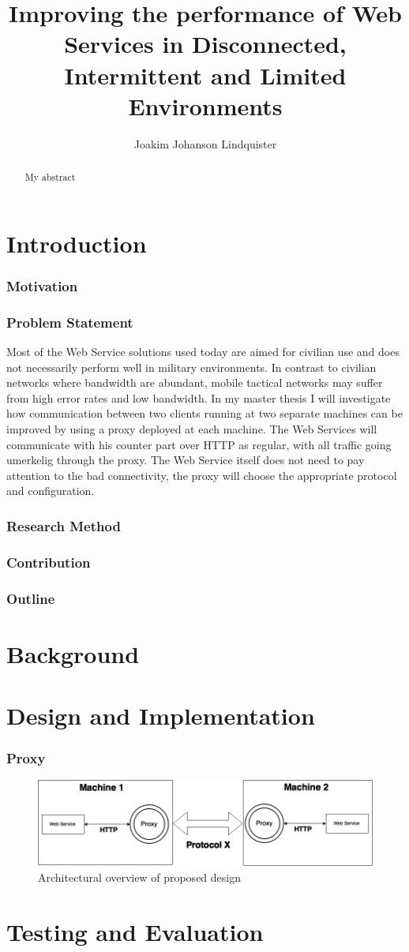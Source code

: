 \documentclass[USenglish]{article}
\title{Improving the performance of Web Services in Disconnected, Intermittent and Limited Environments}
\author{Joakim Johanson Lindquister}
\begin{document}
\ififorside{}

\begin{abstract}
    My abstract
\end{abstract}

\part{Introduction}
\section{Motivation}
\section{Problem Statement}
Most of the Web Service solutions used today are aimed for civilian use and does not necessarily perform well in military environments. In contrast to civilian networks where bandwidth are abundant, mobile tactical networks may suffer from high error rates and low bandwidth. In my master thesis I will investigate how communication between two clients running at two separate machines can be improved by using a proxy deployed at each machine. The Web Services will communicate with his counter part over HTTP as regular, with all traffic going umerkelig through the proxy. The Web Service itself does not need to pay attention to the bad connectivity, the proxy will choose the appropriate protocol and configuration.
\section{Research Method}
\section{Contribution}
\section{Outline}

\part{Background}

\part{Design and Implementation}
\section{Proxy}
\begin{figure}[h]
\includegraphics[scale=0.4]{images/architecture.png}
\caption{Architectural overview of proposed design}
\end{figure}


\part{Testing and Evaluation}
\end{document}
